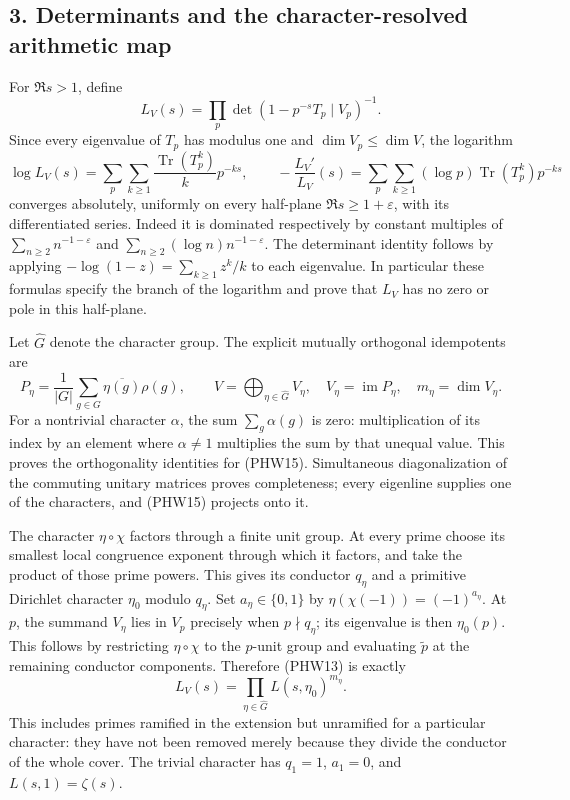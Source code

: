 \documentclass[
  10pt,
  a4paper,
]{article}
\begin{document}
\subsection{3. Determinants and the character-resolved arithmetic
map}\label{determinants-and-the-character-resolved-arithmetic-map}

For \(\Re s>1\), define \[
L_V(s)=\prod_p\det(1-p^{-s}T_p\mid V_p)^{-1}.
\tag{PHW13}
\] Since every eigenvalue of \(T_p\) has modulus one and
\(\dim V_p\le\dim V\), the logarithm \[
\log L_V(s)=\sum_p\sum_{k\ge1}\frac{\operatorname{Tr}(T_p^k)}k p^{-ks},
\qquad
-\frac{L_V'}{L_V}(s)=
\sum_p\sum_{k\ge1}(\log p)\operatorname{Tr}(T_p^k)p^{-ks}
\tag{PHW14}
\] converges absolutely, uniformly on every half-plane
\(\Re s\ge1+\varepsilon\), with its differentiated series. Indeed it is
dominated respectively by constant multiples of
\(\sum_{n\ge2}n^{-1-\varepsilon}\) and
\(\sum_{n\ge2}(\log n)n^{-1-\varepsilon}\). The determinant identity
follows by applying \(-\log(1-z)=\sum_{k\ge1}z^k/k\) to each eigenvalue.
In particular these formulas specify the branch of the logarithm and
prove that \(L_V\) has no zero or pole in this half-plane.

Let \(\widehat G\) denote the character group. The explicit mutually
orthogonal idempotents are \[
P_\eta=\frac1{|G|}\sum_{g\in G}\overline{\eta(g)}\rho(g),
\qquad V=\bigoplus_{\eta\in\widehat G}V_\eta,
\quad V_\eta=\operatorname{im}P_\eta,
\quad m_\eta=\dim V_\eta.
\tag{PHW15}
\] For a nontrivial character \(\alpha\), the sum \(\sum_g\alpha(g)\) is
zero: multiplication of its index by an element where \(\alpha\ne1\)
multiplies the sum by that unequal value. This proves the orthogonality
identities for (PHW15). Simultaneous diagonalization of the commuting
unitary matrices proves completeness; every eigenline supplies one of
the characters, and (PHW15) projects onto it.

The character \(\eta\circ\chi\) factors through a finite unit group. At
every prime choose its smallest local congruence exponent through which
it factors, and take the product of those prime powers. This gives its
conductor \(q_\eta\) and a primitive Dirichlet character \(\eta_0\)
modulo \(q_\eta\). Set \(a_\eta\in\{0,1\}\) by
\(\eta(\chi(-1))=(-1)^{a_\eta}\). At \(p\), the summand \(V_\eta\) lies
in \(V_p\) precisely when \(p\nmid q_\eta\); its eigenvalue is then
\(\eta_0(p)\). This follows by restricting \(\eta\circ\chi\) to the
\(p\)-unit group and evaluating \(\widetilde p\) at the remaining
conductor components. Therefore (PHW13) is exactly \[
L_V(s)=\prod_{\eta\in\widehat G}L(s,\eta_0)^{m_\eta}.
\tag{PHW16}
\] This includes primes ramified in the extension but unramified for a
particular character: they have not been removed merely because they
divide the conductor of the whole cover. The trivial character has
\(q_1=1\), \(a_1=0\), and \(L(s,1)=\zeta(s)\).
\end{document}
